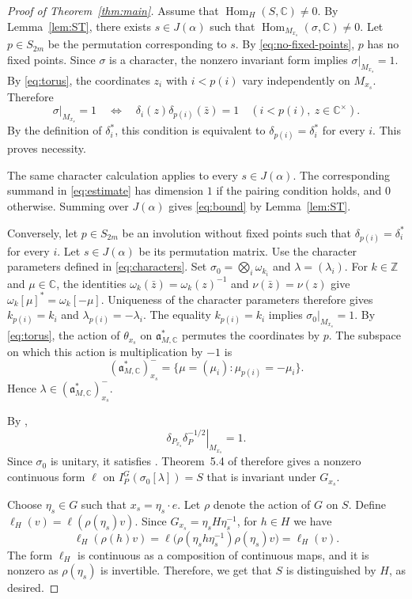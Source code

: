 \documentclass[11pt]{amsart}
\newcommand{\C}{\mathbb C}
\DeclareMathOperator{\Hom}{Hom}
\newcommand{\IP}{I_P^G}
\numberwithin{equation}{section}
\begin{document}
\begin{proof}[Proof of Theorem~\ref{thm:main}]
Assume that $\Hom_H(S,\C)\ne0$.
By Lemma~\ref{lem:ST}, there exists $s\in J(\alpha)$ such that
$\Hom_{M_{x_s}}(\sigma,\C)\ne0$.
Let $p\in S_{2m}$ be the permutation corresponding to $s$. By \eqref{eq:no-fixed-points}, $p$ has no fixed points. Since $\sigma$ is a character, the nonzero invariant form implies
$\sigma|_{M_{x_s}}=1$.
By \eqref{eq:torus}, the coordinates $z_i$ with $i<p(i)$ vary
independently on $M_{x_s}$.
Therefore
\[
 \sigma|_{M_{x_s}}=1
 \quad\Longleftrightarrow\quad
 \delta_i(z)\delta_{p(i)}(\bar z)=1
 \quad(i<p(i),\ z\in\C^\times).
\]
By the definition of $\delta_i^*$, this condition is equivalent
to $\delta_{p(i)}=\delta_i^*$ for every $i$.
This proves necessity.

The same character calculation applies to every $s\in J(\alpha)$.
The corresponding summand in \eqref{eq:estimate} has dimension $1$ if the pairing condition holds, and $0$ otherwise.
Summing over $J(\alpha)$ gives \eqref{eq:bound} by Lemma~\ref{lem:ST}.

Conversely, let $p\in S_{2m}$ be an involution without fixed points
such that $\delta_{p(i)}=\delta_i^*$ for every $i$.
Let $s\in J(\alpha)$ be its permutation matrix.
Use the character parameters defined in \eqref{eq:characters}.
Set $\sigma_0=\bigotimes_i\omega_{k_i}$ and $\lambda=(\lambda_i)$.
For $k\in\mathbb Z$ and $\mu\in\C$, the identities
$\omega_k(\bar z)=\omega_k(z)^{-1}$ and $\nu(\bar z)=\nu(z)$
give $\omega_k[\mu]^*=\omega_k[-\mu]$.
Uniqueness of the character parameters therefore gives
$k_{p(i)}=k_i$ and $\lambda_{p(i)}=-\lambda_i$.
The equality $k_{p(i)}=k_i$ implies $\sigma_0|_{M_{x_s}}=1$.
By \eqref{eq:torus}, the action of $\theta_{x_s}$ on
$\mathfrak a_{M,\C}^*$ permutes the coordinates by $p$.
The subspace on which this action is multiplication by $-1$ is
\[
 (\mathfrak a_{M,\C}^*)_{x_s}^-
 =\{\mu=(\mu_i):\mu_{p(i)}=-\mu_i\}.
\]
Hence $\lambda\in(\mathfrak a_{M,\C}^*)_{x_s}^-$.

By \cite[Lemma~4.2]{MOYglobal},
\[
 \left.\delta_{P_{x_s}}\delta_P^{-1/2}\right|_{M_{x_s}}=1.
\]
Since $\sigma_0$ is unitary, it satisfies
\cite[Assumption~2.2]{MOYlocal}.
Theorem~5.4 of \cite{MOYlocal} therefore gives a nonzero
continuous form $\ell$ on $\IP(\sigma_0[\lambda])=S$ that is
invariant under $G_{x_s}$.

Choose $\eta_s\in G$ such that $x_s=\eta_s\cdot e$.
Let $\rho$ denote the action of $G$ on $S$.
Define $\ell_H(v)=\ell(\rho(\eta_s)v)$.
Since $G_{x_s}=\eta_sH\eta_s^{-1}$, for $h\in H$ we have
\[
 \ell_H(\rho(h)v)
 =\ell\bigl(\rho(\eta_sh\eta_s^{-1})\rho(\eta_s)v\bigr)
 =\ell_H(v).
\]
The form $\ell_H$ is continuous as a composition of continuous maps, and it is nonzero as $\rho(\eta_s)$ is invertible. Therefore, we get that $S$ is distinguished by $H$, as desired.
\end{proof}
\end{document}
